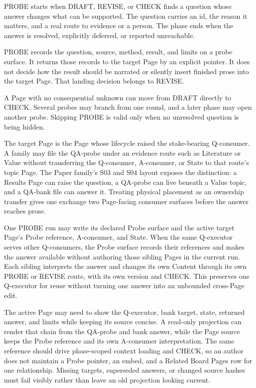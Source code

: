 PROBE starts when DRAFT, REVISE, or CHECK finds a question whose answer changes what can be supported. The question carries an id, the reason it matters, and a real route to evidence or a person. The phase ends when the answer is resolved, explicitly deferred, or reported unreachable.

PROBE records the question, source, method, result, and limits on a probe surface. It returns those records to the target Page by an explicit pointer. It does not decide how the result should be narrated or silently insert finished prose into the target Page. That landing decision belongs to REVISE.

A Page with no consequential unknown can move from DRAFT directly to CHECK. Several probes may branch from one round, and a later phase may open another probe. Skipping PROBE is valid only when no unresolved question is being hidden.

The target Page is the Page whose lifecycle raised the stake-bearing Q-consumer. A family may file the QA-probe under an evidence route such as Literature or Value without transferring the Q-consumer, A-consumer, or State to that route's topic Page. The Paper family's S03 and S04 layout exposes the distinction: a Results Page can raise the question, a QA-probe can live beneath a Value topic, and a QA-bank file can answer it. Treating physical placement as an ownership transfer gives one exchange two Page-facing consumer surfaces before the answer reaches prose.

One PROBE run may write its declared Probe surface and the active target Page's Probe reference, A-consumer, and State. When the same Q-executor serves other Q-consumers, the Probe surface records their references and makes the answer available without authoring those sibling Pages in the current run. Each sibling interprets the answer and changes its own Content through its own PROBE or REVISE route, with its own version and CHECK. This preserves one Q-executor for reuse without turning one answer into an unbounded cross-Page edit.

The active Page may need to show the Q-executor, bank target, state, returned answer, and limits while keeping its source concise. A read-only projection can render that chain from the QA-probe and bank answer, while the Page source keeps the Probe reference and its own A-consumer interpretation. The same reference should drive phase-scoped context loading and CHECK, so an author does not maintain a Probe pointer, an embed, and a Related Board Pages row for one relationship. Missing targets, superseded answers, or changed source hashes must fail visibly rather than leave an old projection looking current.



